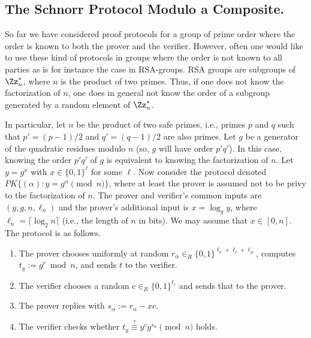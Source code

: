 %


\subsection{The Schnorr Protocol Modulo a Composite.}  
\label{The Schnorr Protocol Modulo a Composite.}  
\label{sec:proto}

So far we have considered proof protocols for a group of prime order where the order is
known to both the prover and the verifier.
However, often one would like to use these kind of protocols in groups
where the order is not known to all parties as is for instance the case
in RSA-groups.
RSA groups are subgroups of $\Zs{n}$, where $n$ is the product of two primes.
Thus, if one does not know the factorization of $n$, one does in general
not know the order of a subgroup generated by a random element of $\Zs{n}$.

In particular, let $n$ be the product of two safe primes, i.e., primes $p$ and $q$ such that
$p'=(p-1)/2$ and $q'=(q-1)/2$ are also primes.
Let $g$ be a generator of the quadratic residues modulo $n$ (so, $g$ will have order
$p'q'$).
In this case, knowing the order $p'q'$ of $g$ is equivalent to knowing the factorization of $n$.
Let $y=g^x$ with $x \in \{0,1\}^\ell$ for some $\ell$.
Now consider the protocol denoted $\textit{PK}\{(\alpha): y = g^\alpha \pmod{n}\}$, where 
at least the prover is assumed not to be  privy to the factorization of $n$.
The prover and verifier's common inputs are $(y,g,n,\ell_n)$ and the prover's additional input is
$x = \log_g y$, where $\ell_n = \lceil \log_2 n \rceil$ (i.e., the length of $n$ in bits). 
We may assume that $x \in [0,n]$.
The protocol is as follows.
\begin{enumerate}
\item The prover chooses uniformly at random $r_\alpha  \in_R \{0,1\}^{\ell_n+\ell_c + \ell_\varnothing}$,
computes $t_y := g^r \bmod{n}$, and sends $t$ to the verifier.
\item The verifier chooses a random $c \in_R \{0,1\}^{\ell_c}$ and sends that to the 
prover.
\item The prover replies with $s_\alpha := r_\alpha - xc$.
\item The verifier checks whether $t_y \stackrel{?}{\equiv} y^c g^{s_\alpha} \pmod{n}$ holds.
\end{enumerate}

